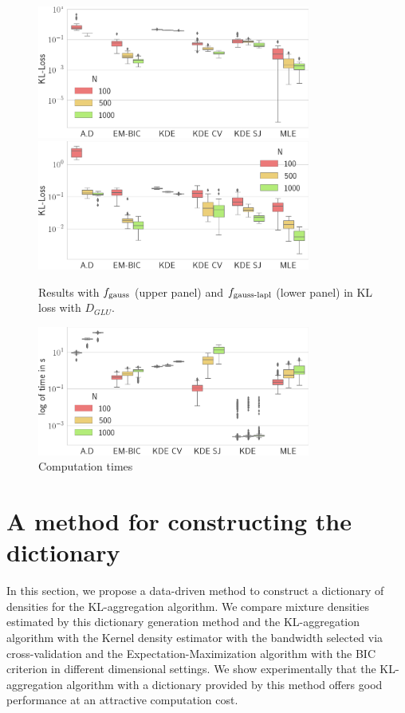 \begin{figure}
\center
    \includegraphics[width=0.8\textwidth]{./TeX_files/res_gauss_KL_GLU.png}
    \includegraphics[width=0.8\textwidth]{./TeX_files/res_lapl_gauss_KL_GLU.png}
    \caption{Results with $f_{\textnormal{gauss}}$ (upper panel) and $f_{\textnormal{gauss-lapl}}$ 
    (lower panel) in KL loss with $D_{GLU}$.}
    \label{fig:res_ext_KL_GLU}
\end{figure} 


\begin{figure}
\center
    \includegraphics[width=0.8\textwidth]{./TeX_files/res_times.png}
    \caption{Computation times}
    \label{fig:res_times}
\end{figure}

\section{A method for constructing the dictionary}

In this section, we propose a data-driven method to construct a dictionary of densities for the KL-aggregation algorithm. We compare mixture densities estimated by this dictionary generation method and the KL-aggregation algorithm with the Kernel density estimator with the bandwidth selected via cross-validation and the Expectation-Maximization algorithm with the BIC criterion in different dimensional settings. We show experimentally that the KL-aggregation algorithm with a dictionary provided by this method offers good performance at an attractive computation cost.

